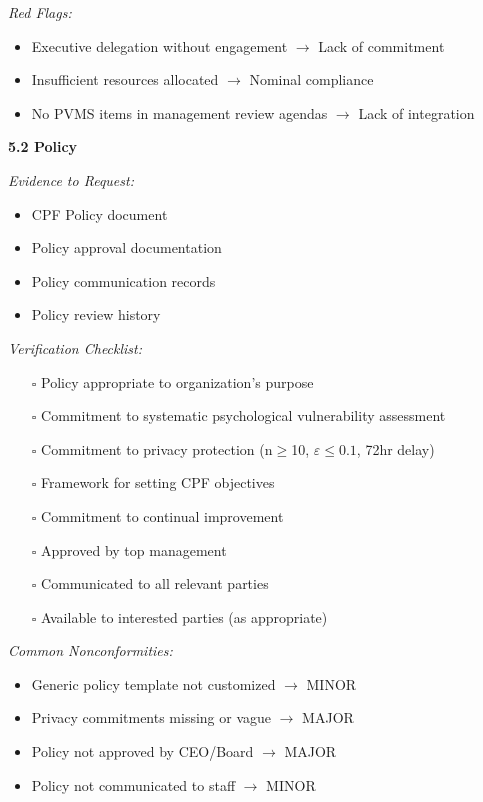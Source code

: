\documentclass[11pt,a4paper]{article}
\begin{document}
\textit{Red Flags:}
\begin{itemize}
\item Executive delegation without engagement $\rightarrow$ Lack of commitment
\item Insufficient resources allocated $\rightarrow$ Nominal compliance
\item No PVMS items in management review agendas $\rightarrow$ Lack of integration
\end{itemize}

\textbf{5.2 Policy}

\textit{Evidence to Request:}
\begin{itemize}
\item CPF Policy document
\item Policy approval documentation
\item Policy communication records
\item Policy review history
\end{itemize}

\textit{Verification Checklist:}
\begin{itemize}
\item[$\square$] Policy appropriate to organization's purpose
\item[$\square$] Commitment to systematic psychological vulnerability assessment
\item[$\square$] Commitment to privacy protection (n$\geq$10, $\varepsilon \leq 0.1$, 72hr delay)
\item[$\square$] Framework for setting CPF objectives
\item[$\square$] Commitment to continual improvement
\item[$\square$] Approved by top management
\item[$\square$] Communicated to all relevant parties
\item[$\square$] Available to interested parties (as appropriate)
\end{itemize}

\textit{Common Nonconformities:}
\begin{itemize}
\item Generic policy template not customized $\rightarrow$ MINOR
\item Privacy commitments missing or vague $\rightarrow$ MAJOR
\item Policy not approved by CEO/Board $\rightarrow$ MAJOR
\item Policy not communicated to staff $\rightarrow$ MINOR
\end{itemize}
\end{document}
